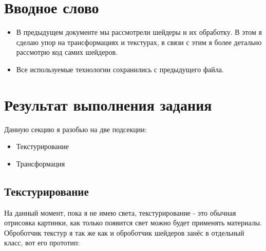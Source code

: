 \documentclass[12pt]{article}
\begin{document}
    \newpage

    \tableofcontents

    \newpage
    \section{Вводное слово}
    \begin{itemize}
        \item В предыдущем документе мы рассмотрели шейдеры и их обработку.
        В этом я сделаю упор на трансформациях и текстурах, в связи 
        с этим я более детально рассмотрю код самих шейдеров. 
        \item Все используемые технологии сохранились с предыдущего файла.
    \end{itemize}
    
    \section{Результат выполнения задания}
    Данную секцию я разобью на две подсекции:
    \begin{itemize}
        \item Текстурирование 
        \item Трансформация
    \end{itemize}
    \subsection{Текстурирование}
    На данный момент, пока я не имею света, текстурирование - это обычная
    отрисовка картинки, как только появится свет можно будет применять
    материалы. Оброботчик текстур я так же как и оброботчик шейдеров
    занёс в отдельный класс, вот его прототип:
\end{document}
